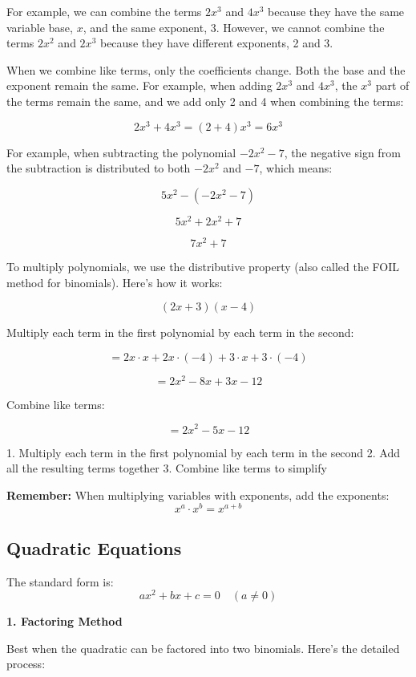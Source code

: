 \documentclass{article} %
\begin{document}
For example, we can combine the terms $2x^3$ and $ 4x^3 $ because they have the same variable base, $x$, and the same exponent, 3. However, we cannot combine the terms $2x^2$ and $2x^3$ because they have different exponents, 2 and 3.

\noindent When we combine like terms, only the coefficients change. Both the base and the exponent remain the same. For example, when adding $ 2x^3 $ and $ 4x^3 $, the $x^3 $ part of the terms remain the same, and we add only 2 and 4 when combining the terms:

\[
2x^3 + 4x^3 = (2 + 4)x^3 = 6x^3
\]

\noindent For example, when subtracting the polynomial \(-2x^2 - 7\), the negative sign from the subtraction is distributed to both \(-2x^2\) and \(-7\), which means:

\[
5x^2 - (-2x^2 - 7)
\]

\[
5x^2 + 2x^2 + 7
\]

\[
7x^2 + 7
\]

\noindent To multiply polynomials, we use the distributive property (also called the FOIL method for binomials). Here's how it works:

\[
(2x + 3)(x - 4)
\]

Multiply each term in the first polynomial by each term in the second:

\[
= 2x \cdot x + 2x \cdot (-4) + 3 \cdot x + 3 \cdot (-4)
\]

\[
= 2x^2 - 8x + 3x - 12
\]

Combine like terms:

\[
= 2x^2 - 5x - 12
\]

1. Multiply each term in the first polynomial by each term in the second
2. Add all the resulting terms together
3. Combine like terms to simplify

\textbf{Remember:} When multiplying variables with exponents, add the exponents:
\[
x^a \cdot x^b = x^{a+b}
\]

\subsection{Quadratic Equations}

The standard form is:
\[ ax^2 + bx + c = 0 \quad (a \neq 0) \]

\textbf{1. Factoring Method}

Best when the quadratic can be factored into two binomials. Here's the detailed process:
\end{document}
